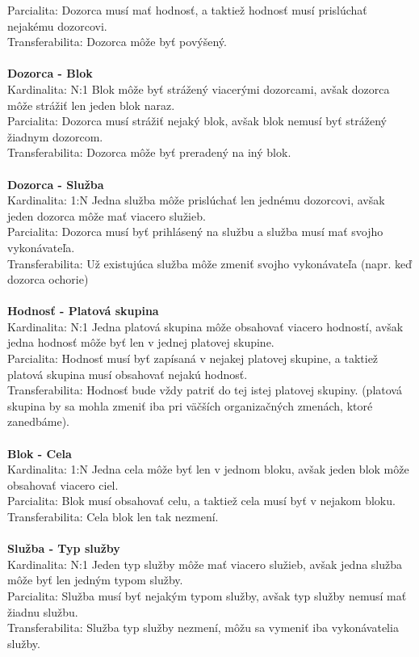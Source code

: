 \documentclass[slovak, 12pt, Times New Roman]{article}
\begin{document}
				Parcialita: Dozorca musí mať hodnosť, a taktiež hodnosť musí prislúchať nejakému dozorcovi.\\ 
				Transferabilita: Dozorca môže byť povýšený.\\ \\
			\textbf{Dozorca - Blok} \\
				Kardinalita: N:1 Blok môže byť strážený viacerými dozorcami, avšak dozorca môže strážiť len jeden blok naraz.\\
				Parcialita: Dozorca musí strážiť nejaký blok, avšak blok nemusí byť strážený žiadnym dozorcom.\\ 
				Transferabilita: Dozorca môže byť preradený na iný blok.\\ \\
			\textbf{Dozorca - Služba} \\
				Kardinalita: 1:N Jedna služba môže prislúchať len jednému dozorcovi, avšak jeden dozorca môže mať viacero služieb.\\
				Parcialita: Dozorca musí byť prihlásený na službu a služba musí mať svojho vykonávateľa.\\ 
				Transferabilita: Už existujúca služba môže zmeniť svojho vykonávateľa (napr. keď dozorca ochorie)\\ \\
			\textbf{Hodnosť - Platová skupina} \\
				Kardinalita: N:1 Jedna platová skupina môže obsahovať viacero hodností, avšak jedna hodnosť môže byť len v jednej platovej 
				skupine.\\
				Parcialita: Hodnosť musí byť zapísaná v nejakej platovej skupine, a taktiež platová skupina musí obsahovať nejakú hodnosť.\\ 
				Transferabilita: Hodnosť bude vždy patriť do tej istej platovej skupiny. (platová skupina by sa mohla zmeniť iba pri väčších organizačných zmenách, ktoré zanedbáme).\\ \\
			\textbf{Blok - Cela} \\
				Kardinalita: 1:N Jedna cela môže byť len v jednom bloku, avšak jeden blok môže obsahovať viacero ciel.\\
				Parcialita: Blok musí obsahovať celu, a taktiež cela musí byť v nejakom bloku.\\ 
				Transferabilita: Cela blok len tak nezmení.\\ \\
			\textbf{Služba - Typ služby} \\
				Kardinalita: N:1 Jeden typ služby môže mať viacero služieb, avšak jedna služba môže byť len jedným typom služby.\\
				Parcialita: Služba musí byť nejakým typom služby, avšak typ služby nemusí mať žiadnu službu.\\ 
				Transferabilita: Služba typ služby nezmení, môžu sa vymeniť iba vykonávatelia služby.\\ \\
		\clearpage
\end{document}
